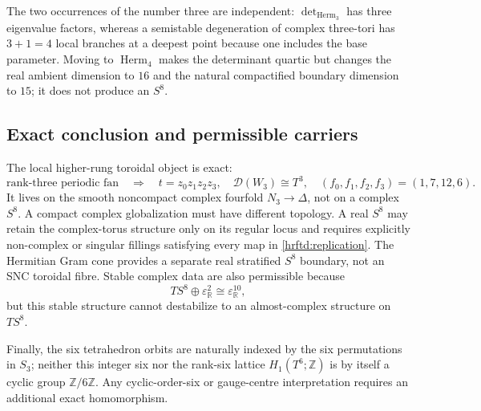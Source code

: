 The two occurrences of the number three are independent:
\(\det_{\operatorname{Herm}_3}\) has three eigenvalue factors, whereas a
semistable degeneration of complex three-tori has \(3+1=4\) local branches
at a deepest point because one includes the base parameter.  Moving to
\(\operatorname{Herm}_4\) makes the determinant quartic but changes the real
ambient dimension to \(16\) and the natural compactified boundary dimension
to \(15\); it does not produce an \(S^8\).

\subsection{Exact conclusion and permissible carriers}
\label{hrftd:conclusion}

The local higher-rung toroidal object is exact:
\[
 \boxed{
 \text{rank-three periodic fan}
 \quad\Longrightarrow\quad
 t=z_0z_1z_2z_3,\quad
 \mathcal D(W_3)\cong T^3,\quad
 (f_0,f_1,f_2,f_3)=(1,7,12,6).
 }
\]
It lives on the smooth noncompact complex fourfold \(N_3\to\Delta\), not on
a complex \(S^8\).  A compact complex globalization must have different
topology.  A real \(S^8\) may retain the complex-torus structure only on its
regular locus and requires explicitly non-complex or singular fillings
satisfying every map in \cref{hrftd:replication}.  The Hermitian Gram cone
provides a separate real stratified \(S^8\) boundary, not an SNC toroidal
fibre.  Stable complex data are also permissible because
\[
 TS^8\oplus\varepsilon^2_{\mathbb R}
 \cong\varepsilon^{10}_{\mathbb R},
\]
but this stable structure cannot destabilize to an almost-complex structure
on \(TS^8\).

Finally, the six tetrahedron orbits are naturally indexed by the six
permutations in \(S_3\); neither this integer six nor the rank-six lattice
\(H_1(T^6;\mathbb Z)\) is by itself a cyclic group
\(\mathbb Z/6\mathbb Z\).  Any cyclic-order-six or gauge-centre
interpretation requires an additional exact homomorphism.
